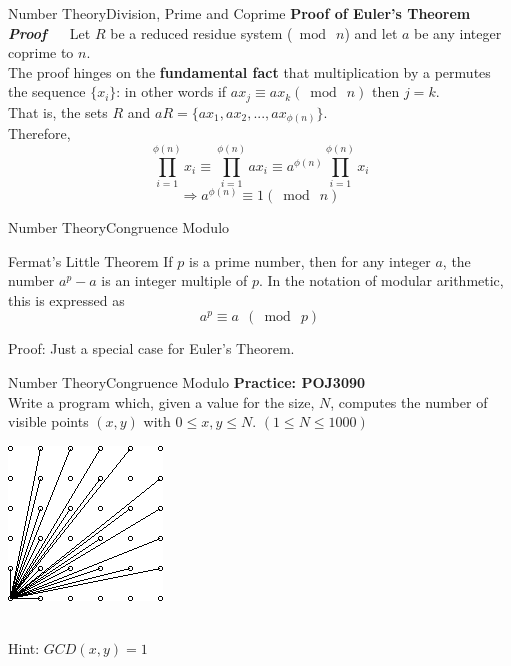 \documentclass[mathserif,10pt]{beamer}
\begin{document}
\begin{frame}{Number Theory}{Division, Prime and Coprime}
\textbf{\large Proof of Euler's Theorem} \\
\textbf{\sl Proof} ~~ Let $R$ be a reduced residue system ($\bmod~ n$) and let $a$ be any integer coprime to $n$. \\
\pause
The proof hinges on the \textbf{fundamental fact} that multiplication by a permutes the sequence $\{x_i\}$: in other words if $ax_j \equiv ax_k (\bmod~n)$ then $j = k$. 
\\
\pause
That is, the sets $R$ and $aR = \{ax_1, ax_2, ..., ax_{\phi(n)}\}$. \\
\pause
Therefore, $$\prod_{i=1}^{\phi(n)}x_i \equiv \prod_{i=1}^{\phi(n)} ax_i \equiv a^{\phi(n)}\prod_{i=1}^{\phi(n)}x_i$$
\pause
$$\Rightarrow a^{\phi(n)} \equiv 1 (\bmod~n)$$
\end{frame}


\begin{frame}{Number Theory}{Congruence Modulo}
\begin{block}{Fermat's Little Theorem}
If $p$ is a prime number, then for any integer $a$, the number $a^p - a$ is an integer multiple of $p$. In the notation of modular arithmetic, this is expressed as
$$a^p \equiv a ~~(\bmod~ p)$$
\end{block}
\pause
Proof: Just a special case for Euler's Theorem. 
\end{frame}

\begin{frame}{Number Theory}{Congruence Modulo}
\textbf{\large Practice: POJ3090} \\
Write a program which, given a value for the size, $N$, computes the number of visible points $(x, y)$ with $0 \leq x, y \leq N$. $(1\leq N \leq 1000)$
\begin{center}
\includegraphics[width=0.2\linewidth]{Images/3090}
\end{center}
\pause
~\\ Hint: $GCD(x,y) = 1$
\end{frame}
\end{document}
